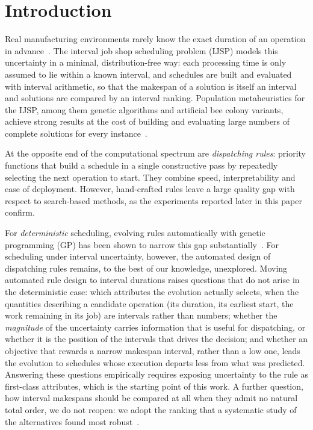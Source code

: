 \documentclass[review,authoryear,11pt]{elsarticle}
\begin{document}
\section{Introduction}
\label{sec:intro}

Real manufacturing environments rarely know the exact duration of an
operation in advance~\citep{Allahverdi2022}. The interval job shop scheduling problem (IJSP)
models this uncertainty in a minimal, distribution-free way: each
processing time is only assumed to lie within a known interval, and
schedules are built and evaluated with interval arithmetic, so that the
makespan of a solution is itself an interval and solutions are compared
by an interval ranking. Population metaheuristics for the
IJSP, among them genetic algorithms and artificial bee colony variants,
achieve strong results at the cost of building and evaluating
large numbers of complete solutions for every
instance~\citep{DiazGA2020,DiazFEABC2023,DiazICAE2023}.

At the opposite end of the computational spectrum are \emph{dispatching
rules}: priority functions that build a schedule in a single constructive
pass by repeatedly selecting the next operation to start. They combine
speed, interpretability and ease of deployment. However,
hand-crafted rules leave a large quality
gap with respect to search-based methods, as the experiments reported
later in this paper confirm.

For \emph{deterministic} scheduling, evolving rules automatically with
genetic programming (GP) has been shown to narrow this gap
substantially~\citep{Branke2016,Nguyen2017}. For scheduling
under interval uncertainty, however, the automated design of dispatching
rules remains, to the best of our knowledge, unexplored. Moving automated
rule design to interval durations raises questions that do not
arise in the deterministic case: which attributes the evolution
actually selects, when the quantities describing a candidate operation
(its duration, its earliest start, the work remaining in its job) are
intervals rather than numbers; whether the \emph{magnitude} of the uncertainty carries
information that is useful for dispatching, or whether it is the
position of the intervals that drives the decision; and whether an
objective that rewards a narrow makespan interval, rather than a low
one, leads the evolution to schedules whose execution departs less from
what was predicted. Answering these questions empirically requires
exposing uncertainty to the rule as first-class attributes, which is the
starting point of this work. A further question, how interval makespans
should be compared at all when they admit no natural total order, we do
not reopen: we adopt the ranking that a systematic study of the
alternatives found most robust~\citep{DiazGA2020}.
\end{document}
